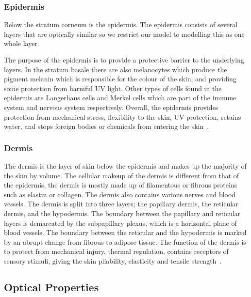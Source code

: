 
\subsubsection*{Epidermis} %
\label{ssub:epidermis}

Below the stratum corneum is the epidermis.
The epidermis consists of several layers that are optically similar so we restrict our model to modelling this as one whole layer.

The purpose of the epidermis is to provide a protective barrier to the underlying layers. 
In the stratum basale there are also melanocytes which produce the pigment melanin which is responsible for the colour of the skin, and providing some protection from harmful UV light. 
Other types of cells found in the epidermis are Langerhans cells and Merkel cells which are part of the immune system and nervous system respectively.
Overall, the epidermis provides protection from mechanical stress, flexibility to the skin, UV protection, retains water, and stops foreign bodies or chemicals from entering the skin~\cite{freedberg1999fitzpatrick,zaidi2010dermatology}.


\subsubsection*{Dermis} %
\label{sub:dermis}
The dermis is the layer of skin below the epidermis and makes up the majority of the skin by volume.
The cellular makeup of the dermis is different from that of the epidermis, the dermis is mostly made up of filamentous or fibrous proteins such as elastin or collagen.
The dermis also contains various nerves and blood vessels.
The dermis is split into three layers; the papillary dermis, the reticular dermis, and the hypodermis.
The boundary between the papillary and reticular layers is demarcated by the subpapillary plexus, which is a horizontal plane of blood vessels.
The boundary between the reticular and the hypodermis is marked by an abrupt change from fibrous to adipose tissue.
The function of the dermis is to protect from mechanical injury, thermal regulation, contains receptors of sensory stimuli, giving the skin pliability, elasticity and tensile strength~\cite{freedberg1999fitzpatrick,zaidi2010dermatology}.
 


\subsection{Optical Properties} %
\label{sub:optical_properties}


